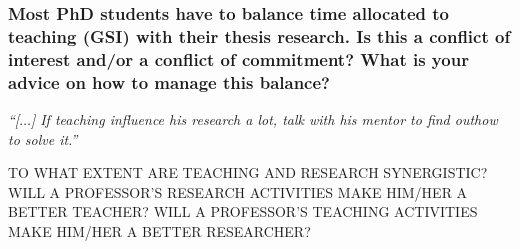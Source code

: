 \documentclass[12pt]{beamer}
\newcommand\ans[1]{{\it ``#1''}}
\newcommand\gap{\vspace{5mm}}
\begin{document}
\begin{frame} 
\frametitle{ 
Most PhD students have to balance time allocated to teaching (GSI) with their thesis research. Is this a conflict of interest and/or a conflict of commitment? What is your advice on how to manage this balance?
}


\ans{[$\dots$] If teaching influence his research a lot, talk with his mentor to find outhow to solve it.}


\gap





\end{frame} 
\begin{frame}

\gap

TO WHAT EXTENT ARE TEACHING AND RESEARCH SYNERGISTIC? WILL A PROFESSOR'S RESEARCH ACTIVITIES MAKE HIM/HER A BETTER TEACHER? WILL A PROFESSOR'S TEACHING ACTIVITIES MAKE HIM/HER A BETTER RESEARCHER?
\end{frame}
\end{document}
